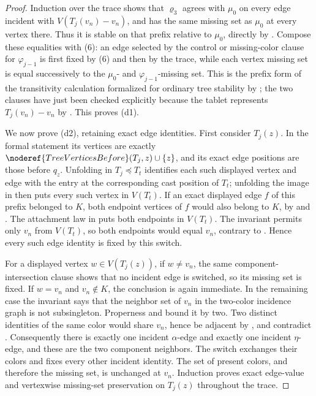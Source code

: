 \begin{proof}
Induction over the trace shows that \(\varrho_3\) agrees with \(\mu_0\) on
every edge incident with \(V(T_j(v_n)-v_n)\), and has the same missing set
as \(\mu_0\) at every vertex there.  Thus it is stable on that prefix
relative to \(\mu_0\), directly by
.  Compose these equalities with (6):
an edge selected by the control or missing-color clause for
\(\varphi_{j-1}\) is first fixed by (6) and then by the trace, while each
vertex missing set is equal successively to the \(\mu_0\)- and
\(\varphi_{j-1}\)-missing set.  This is the prefix form of the transitivity
calculation formalized for ordinary tree stability by ; the
two clauses have just been checked explicitly because the tablet represents
\(T_j(v_n)-v_n\) by .  This proves
(d1).

We now prove (d2), retaining exact edge identities.  First consider
\(T_j(z)\).  In the formal statement its vertices are exactly
\(\noderef{TreeVerticesBefore}(T_j,z)\cup\{z\}\), and its exact edge
positions are those before \(q_z\).  Unfolding
 in \(T_j\preccurlyeq T_t\) identifies
each such displayed vertex and edge with the entry at the corresponding
cast position of \(T_t\); unfolding the image in
 then puts every such vertex in \(V(T_t)\).
If an exact displayed edge \(f\) of this prefix belonged to \(K\), both
endpoint vertices of \(f\) would also belong to \(K\), by
 and .  The
attachment law in  puts both endpoints in \(V(T_t)\).
The invariant permits only \(v_n\) from \(V(T_t)\), so both endpoints would
equal \(v_n\), contrary to .  Hence every such
edge identity is fixed by this switch.

For a displayed vertex \(w\in V(T_j(z))\), if \(w\ne v_n\), the same
component-intersection clause shows that no incident edge is switched, so
its missing set is fixed.  If \(w=v_n\) and \(v_n\notin K\), the conclusion
is again immediate.  In the remaining case the invariant says that the
neighbor set of \(v_n\) in the two-color incidence graph is not
subsingleton.  Properness and
 bound it by two.  Two distinct
identities of the same color would share \(v_n\), hence be adjacent by
, and contradict
.  Consequently there is exactly one
incident \(\alpha\)-edge and exactly one incident \(\eta\)-edge, and these
are the two component neighbors.  The switch exchanges their colors and
fixes every other incident identity.  The set of present colors, and
therefore the missing set, is unchanged at \(v_n\).  Induction proves exact
edge-value and vertexwise missing-set preservation on \(T_j(z)\) throughout
the trace.


\end{proof}
